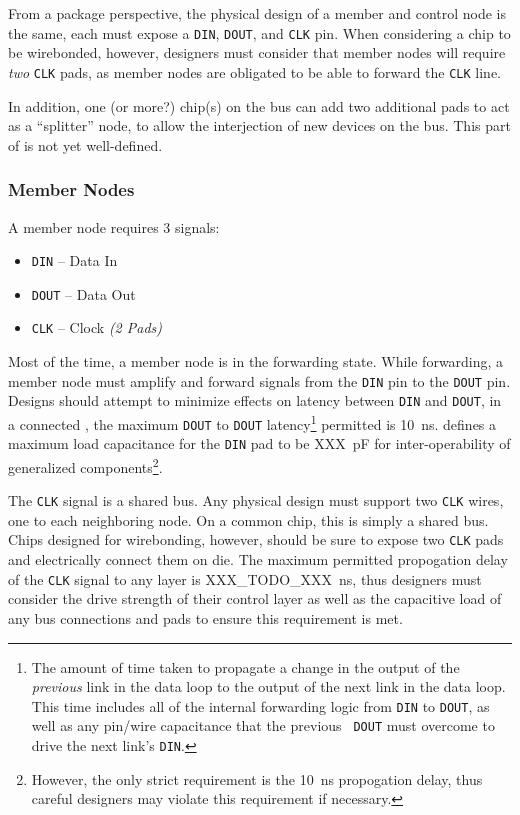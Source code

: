 From a package perspective, the physical design of a member and control node
is the same, each must expose a {\tt DIN}, {\tt DOUT}, and {\tt CLK} pin. When
considering a chip to be wirebonded, however, designers must consider that
member nodes will require {\em two} {\tt CLK} pads, as member nodes are
obligated to be able to forward the {\tt CLK} line.

In addition, one (or more?) chip(s) on the bus can add two additional pads to
act as a ``splitter'' node, to allow the interjection of new devices on the
bus. This part of \bus is not yet well-defined.

\subsubsection{Member Nodes}
\label{sec:physical-member}
A member node requires 3 signals:

\begin{itemize}
  \item {\tt DIN} -- Data In
  \item {\tt DOUT} -- Data Out
  \item {\tt CLK} -- Clock {\em (2 Pads)}
\end{itemize}

Most of the time, a member node is in the {\sc forwarding} state. While
forwarding, a member node must amplify and forward signals from the {\tt DIN}
pin to the {\tt DOUT} pin. Designs should attempt to minimize effects on
latency between {\tt DIN} and {\tt DOUT}, in a connected \bus, the maximum
{\tt DOUT} to {\tt DOUT} latency\footnote{
  The amount of time taken to propagate a change in the output of the {\em
  previous} link in the data loop to the output of the next link in the data
  loop. This time includes all of the internal forwarding logic from {\tt DIN}
  to {\tt DOUT}, as well as any pin/wire capacitance that the previous {\tt
  DOUT} must overcome to drive the next link's {\tt DIN}.}
permitted is 10~ns. \bus defines a maximum load capacitance for the {\tt DIN}
pad to be XXX~pF for inter-operability of generalized components\footnote{
  However, the only strict requirement is the 10~ns propogation delay, thus
  careful designers may violate this requirement if necessary.}.

The {\tt CLK} signal is a shared bus. Any physical design must support two
{\tt CLK} wires, one to each neighboring node. On a common chip, this is
simply a shared bus. Chips designed for wirebonding, however, should be sure
to expose two {\tt CLK} pads and electrically connect them on die. The maximum
permitted propogation delay of the {\tt CLK} signal to any layer is
XXX\_TODO\_XXX~ns, thus designers must consider the drive strength of their
control layer as well as the capacitive load of any bus connections and pads
to ensure this requirement is met.

